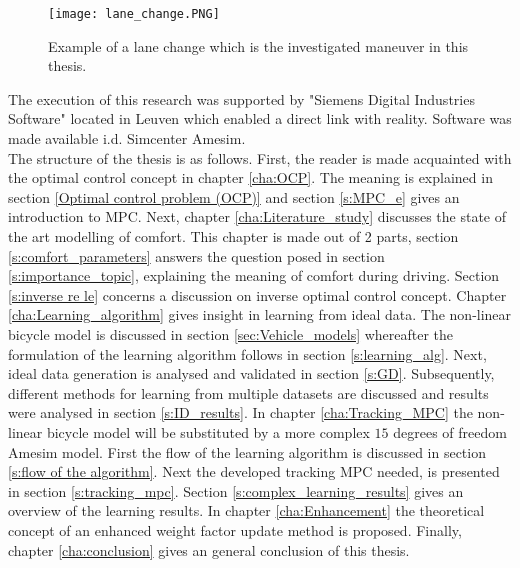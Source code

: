 \begin{figure}[htp]
	\centering
	\texttt{[image: lane\_change.PNG]}
	\caption{Example of a lane change which is the investigated maneuver in this thesis.}
	\label{fig:lane_change}
\end{figure}

The execution of this research was supported by "Siemens Digital Industries Software" located in Leuven which enabled a direct link with reality. Software was made available i.d. Simcenter Amesim.\\

The structure of the thesis is as follows. First, the reader is made acquainted with the optimal control concept in chapter \ref{cha:OCP}. The meaning is explained in section \ref{Optimal control problem (OCP)} and section \ref{s:MPC_e} gives an introduction to MPC. Next, chapter \ref{cha:Literature_study} discusses the state of the art modelling of comfort. This chapter is made out of 2 parts, section \ref{s:comfort_parameters} answers the question posed in section \ref{s:importance_topic}, explaining the meaning of comfort during driving. Section \ref{s:inverse re le} concerns a discussion on inverse optimal control concept. Chapter \ref{cha:Learning_algorithm} gives insight in learning from ideal data. The non-linear bicycle model is discussed in section \ref{sec:Vehicle_models} whereafter the formulation of the learning algorithm follows in section \ref{s:learning_alg}. Next, ideal data generation is analysed and validated in section \ref{s:GD}. Subsequently, different methods for learning from multiple datasets are discussed and results were analysed in section \ref{s:ID_results}. In chapter \ref{cha:Tracking_MPC} the non-linear bicycle model will be substituted by a more complex $15$ degrees of freedom Amesim model. First the flow of the learning algorithm is discussed in section \ref{s:flow of the algorithm}. Next the developed tracking MPC needed, is presented in section \ref{s:tracking_mpc}. Section \ref{s:complex_learning_results} gives an overview of the learning results. 
In chapter \ref{cha:Enhancement} the theoretical concept of an enhanced weight factor update method is proposed. Finally, chapter \ref{cha:conclusion} gives an general conclusion of this thesis.\\


